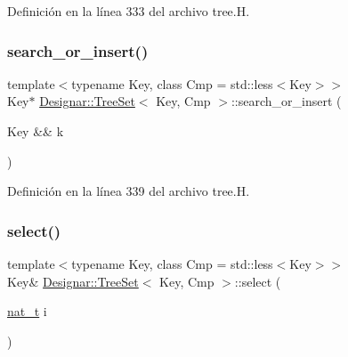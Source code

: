 Definición en la línea 333 del archivo tree.\+H.

\mbox{\label{class_designar_1_1_tree_set_a481f16723d8f1e3c2d351d93910a34cd}} 
\subsubsection{\texorpdfstring{search\+\_\+or\+\_\+insert()}{search\_or\_insert()}\hspace{0.1cm}{\footnotesize\ttfamily [2/2]}}
{\footnotesize\ttfamily template$<$typename Key, class Cmp = std\+::less$<$\+Key$>$$>$ \\
Key$\ast$ \hyperlink{class_designar_1_1_tree_set}{Designar\+::\+Tree\+Set}$<$ Key, Cmp $>$\+::search\+\_\+or\+\_\+insert (\begin{DoxyParamCaption}\item[{Key \&\&}]{k }\end{DoxyParamCaption})\hspace{0.3cm}{\ttfamily [inline]}}



Definición en la línea 339 del archivo tree.\+H.

\mbox{\label{class_designar_1_1_tree_set_a1592ef402d18c3e8664c56d9554ae993}} 
\subsubsection{\texorpdfstring{select()}{select()}\hspace{0.1cm}{\footnotesize\ttfamily [1/2]}}
{\footnotesize\ttfamily template$<$typename Key, class Cmp = std\+::less$<$\+Key$>$$>$ \\
Key\& \hyperlink{class_designar_1_1_tree_set}{Designar\+::\+Tree\+Set}$<$ Key, Cmp $>$\+::select (\begin{DoxyParamCaption}\item[{\hyperlink{namespace_designar_aa72662848b9f4815e7bf31a7cf3e33d1}{nat\+\_\+t}}]{i }\end{DoxyParamCaption})\hspace{0.3cm}{\ttfamily [inline]}}



